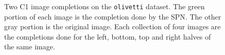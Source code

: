 \documentclass{amsart}
\theoremstyle{plain}
\numberwithin{equation}{section}
\newcommand{\code}[1]{\lstinline[mathescape=true]{#1}}
\begin{document}
\begin{figure}[h]
  \captionsetup{singlelinecheck=false,justification=justified,margin=0cm}
  \caption{Two C1 image completions on the \code{olivetti} dataset. The green portion of each image
  is the completion done by the SPN\@. The other gray portion is the original image. Each
  collection of four images are the completions done for the left, bottom, top and right halves of
  the same image.}\label{fig:c1_olivetti_cmpl}
\end{figure}
\end{document}
